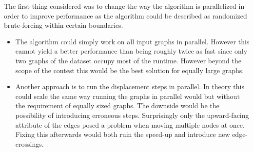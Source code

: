 \documentclass[]{llncs}
\begin{document}
	The first thing considered was to change the way the algorithm is parallelized in order to improve performance as the algorithm could be described as randomized brute-forcing within certain boundaries. 
	\begin{itemize}
		\item The algorithm could simply work on all input graphs in parallel. However this cannot yield a better performance than being roughly twice as fast since only two graphs of the dataset occupy most of the runtime. However beyond the scope of the contest this would be the best solution for equally large graphs.
		\item Another approach is to run the displacement steps in parallel. In theory this could scale the same way running the graphs in parallel would but without the requirement of equally sized graphs. The downside would be the possibility of introducing erroneous steps. Surprisingly only the upward-facing attribute of the edges posed a problem when moving multiple nodes at once. Fixing this afterwards would both ruin the speed-up and introduce new edge-crossings.
	\end{itemize}
	
\end{document}
